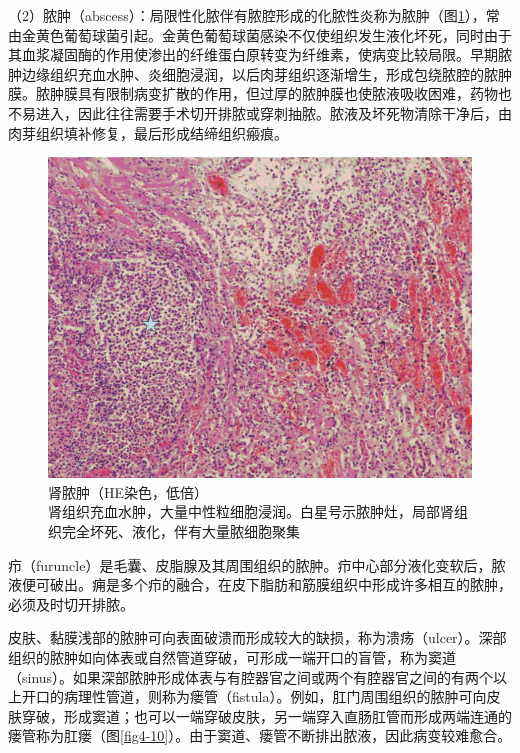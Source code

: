 （2）脓肿（abscess）：局限性化脓伴有脓腔形成的化脓性炎称为脓肿（图\ref{fig4-9}），常由金黄色葡萄球菌引起。金黄色葡萄球菌感染不仅使组织发生液化坏死，同时由于其血浆凝固酶的作用使渗出的纤维蛋白原转变为纤维素，使病变比较局限。早期脓肿边缘组织充血水肿、炎细胞浸润，以后肉芽组织逐渐增生，形成包绕脓腔的脓肿膜。脓肿膜具有限制病变扩散的作用，但过厚的脓肿膜也使脓液吸收困难，药物也不易进入，因此往往需要手术切开排脓或穿刺抽脓。脓液及坏死物清除干净后，由肉芽组织填补修复，最后形成结缔组织瘢痕。

\begin{figure}[!htbp]
  \centering
  \includegraphics{./images/Image00060.jpg}
  \captionsetup{justification=centering}
  \caption{肾脓肿（HE染色，低倍）\\ {\small 肾组织充血水肿，大量中性粒细胞浸润。白星号示脓肿灶，局部肾组织完全坏死、液化，伴有大量脓细胞聚集}}
  \label{fig4-9}
\end{figure}



疖（furuncle）是毛囊、皮脂腺及其周围组织的脓肿。疖中心部分液化变软后，脓液便可破出。痈是多个疖的融合，在皮下脂肪和筋膜组织中形成许多相互的脓肿，必须及时切开排脓。

皮肤、黏膜浅部的脓肿可向表面破溃而形成较大的缺损，称为溃疡（ulcer）。深部组织的脓肿如向体表或自然管道穿破，可形成一端开口的盲管，称为窦道（sinus）。如果深部脓肿形成体表与有腔器官之间或两个有腔器官之间的有两个以上开口的病理性管道，则称为瘘管（fistula）。例如，肛门周围组织的脓肿可向皮肤穿破，形成窦道；也可以一端穿破皮肤，另一端穿入直肠肛管而形成两端连通的瘘管称为肛瘘（图\ref{fig4-10}）。由于窦道、瘘管不断排出脓液，因此病变较难愈合。

